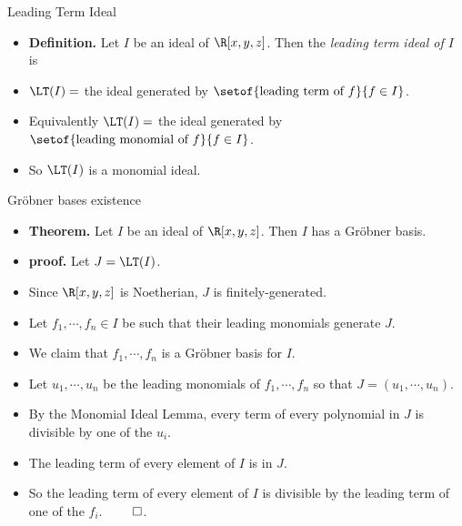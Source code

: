 \documentclass[handout]{beamer}
\begin{document}
\begin{frame}{Leading Term Ideal}

\begin{itemize}
  \item \textbf{Definition.}  Let $I$ be an ideal of $\R[x,y,z]$. Then the \emph{leading term ideal of $I$} is
  \item $\LT(I) = $ the ideal generated by $\setof{\text{leading term of } f}{f\in I}$.
  \item Equivalently $\LT(I) = $ the ideal generated by $\setof{\text{leading monomial of } f}{f\in I}$.
  \item So $\LT(I)$ is a monomial ideal.
\end{itemize}

\end{frame}

\begin{frame}{Gr\"{o}bner bases existence}

\begin{itemize}
  \item \textbf{Theorem.} Let $I$ be an ideal of $\R[x,y,z]$. Then $I$ has a Gr\"{o}bner basis.
  \item \textbf{proof.} Let $J = \LT(I)$.
  \item Since $\R[x,y,z]$ is Noetherian, $J$ is finitely-generated.
  \item Let $f_1,\cdots,f_n\in I$ be such that their leading monomials generate $J$.
  \item We claim that $f_1,\cdots, f_n$ is a Gr\"{o}bner basis for $I$.
  \item Let $u_1,\cdots,u_n$ be the leading monomials of $f_1,\cdots, f_n$ so that $J=(u_1,\cdots,u_n)$.
  \item By the Monomial Ideal Lemma, every term of every polynomial in $J$ is divisible by one of the $u_i$.
  \item The leading term of every element of $I$ is in $J$.
  \item So the leading term of every element of $I$ is divisible by the leading term of one of the $f_i$. $\qed$.
\end{itemize}

\end{frame}
\end{document}
